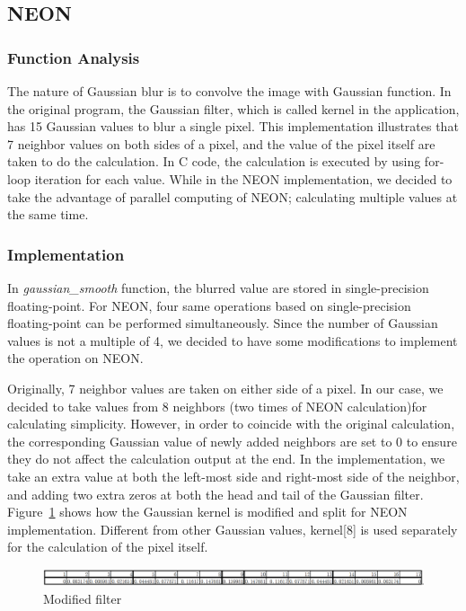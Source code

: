 \subsection{NEON}
\subsubsection{Function Analysis}

The nature of Gaussian blur is to convolve the image with Gaussian function. In the original program, the Gaussian filter, which is called kernel in the application, has 15 Gaussian values to blur a single pixel. This implementation illustrates that 7 neighbor values on both sides of a pixel, and the value of the pixel itself are taken to do the calculation. In C code, the calculation is executed by using for-loop iteration for each value. While in the NEON implementation, we decided to take the advantage of parallel computing of NEON; calculating multiple values at the same time.

\subsubsection{Implementation}

In \textit{gaussian\_smooth} function, the blurred value are stored in single-precision floating-point. For NEON, four same operations based on single-precision floating-point can be performed simultaneously. Since the number of Gaussian values is not a multiple of 4, we decided to have some modifications to implement the operation on NEON. 

Originally, 7 neighbor values are taken on either side of a pixel. In our case, we decided to take values from 8 neighbors (two times of NEON calculation)for calculating simplicity. However, in order to coincide with the original calculation, the corresponding Gaussian value of newly added neighbors are set to 0 to ensure they do not affect the calculation output at the end. In the implementation, we take an extra value at both the left-most side and right-most side of the neighbor, and adding two extra zeros at both the head and tail of the Gaussian filter. Figure~\ref{fig:newfilter} shows how the Gaussian kernel is modified and split for NEON implementation. Different from other Gaussian values, kernel[8] is used separately for the calculation of the pixel itself. 

\begin{figure}
\centering
\includegraphics[width=\linewidth]{drawings/filter}
\caption{Modified filter}
\label{fig:newfilter}
\end{figure}

